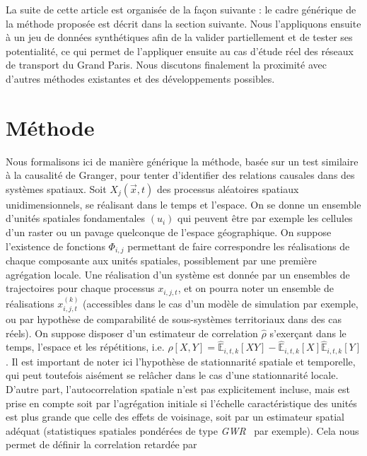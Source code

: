 \documentclass[french]{./sageo}
\begin{document}
La suite de cette article est organisée de la façon suivante : le cadre générique de la méthode proposée est décrit dans la section suivante. Nous l'appliquons ensuite à un jeu de données synthétiques afin de la valider partiellement et de tester ses potentialité, ce qui permet de l'appliquer ensuite au cas d'étude réel des réseaux de transport du Grand Paris. Nous discutons finalement la proximité avec d'autres méthodes existantes et des développements possibles.



\section{Méthode}



Nous formalisons ici de manière générique la méthode, basée sur un test similaire à la causalité de Granger, pour tenter d'identifier des relations causales dans des systèmes spatiaux. Soit $X_j(\vec{x},t)$ des processus aléatoires spatiaux unidimensionnels, se réalisant dans le temps et l'espace. On se donne un ensemble d'unités spatiales fondamentales $(u_i)$ qui peuvent être par exemple les cellules d'un raster ou un pavage quelconque de l'espace géographique. On suppose l'existence de fonctions $\Phi_{i,j}$ permettant de faire correspondre les réalisations de chaque composante aux unités spatiales, possiblement par une première agrégation locale. Une réalisation d'un système est donnée par un ensembles de trajectoires pour chaque processus $x_{i,j,t}$, et on pourra noter un ensemble de réalisations $x^{(k)}_{i,j,t}$ (accessibles dans le cas d'un modèle de simulation par exemple, ou par hypothèse de comparabilité de sous-systèmes territoriaux dans des cas réels). On suppose disposer d'un estimateur de correlation $\hat{\rho}$ s'exerçant dans le temps, l'espace et les répétitions, i.e. $\hat{\rho}\left[X,Y\right] = \hat{\mathbb{E}}_{i,t,k}\left[XY\right] - \hat{\mathbb{E}}_{i,t,k}\left[X\right]\hat{\mathbb{E}}_{i,t,k}\left[Y\right]$. Il est important de noter ici l'hypothèse de stationnarité spatiale et temporelle, qui peut toutefois aisément se relâcher dans le cas d'une stationnarité locale. D'autre part, l'autocorrelation spatiale n'est pas explicitement incluse, mais est prise en compte soit par l'agrégation initiale si l'échelle caractéristique des unités est plus grande que celle des effets de voisinage, soit par un estimateur spatial adéquat (statistiques spatiales pondérées de type \emph{GWR}~\cite{brunsdon1998geographically} par exemple). Cela nous permet de définir la correlation retardée par
\end{document}
